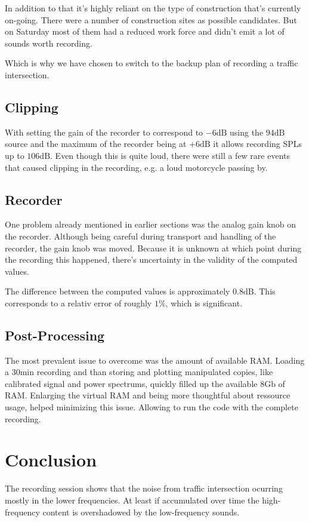 \documentclass[twocolumn]{article}
\begin{document}
In addition to that it's highly reliant on the type of construction that's currently on-going.
There were a number of construction sites as possible candidates.
But on Saturday most of them had a reduced work force and didn't emit a lot of sounds
worth recording.

Which is why we have chosen to switch to the backup plan of recording a traffic intersection.

\subsection{Clipping}
With setting the gain of the recorder to correspond to $-6 \textrm{dB}$ using the $94 \textrm{dB}$ source
and the maximum of the recorder being at $+6 \textrm{dB}$ it allows recording SPLs up to $106 \textrm{dB}$.
Even though this is quite loud, there were still a few rare events that caused clipping in the recording,
e.g. a loud motorcycle passing by.


\subsection{Recorder}
\label{subsec:recorder}
One problem already mentioned in earlier sections was the analog gain knob on the recorder.
Although being careful during transport and handling of the recorder, the gain knob was moved.
Because it is unknown at which point during the recording this happened, there's uncertainty
in the validity of the computed values.

The difference between the computed values is approximately $0.8 \textrm{dB}$.
This corresponds to a relativ error of roughly $1\%$, which is significant.


\subsection{Post-Processing}
The most prevalent issue to overcome was the amount of available RAM.
Loading a $30\textrm{min}$ recording and than storing and plotting manipulated copies, like calibrated
signal and power spectrums, quickly filled up the available $8\textrm{Gb}$ of RAM.
Enlarging the virtual RAM and being more thoughtful about ressource usage, helped minimizing this
issue. Allowing to run the code with the complete recording.

\section{Conclusion}
The recording session shows that the noise from traffic intersection ocurring mostly in the lower
frequencies.
At least if accumulated over time the high-frequency content is overshadowed by the low-frequency sounds.
\end{document}
